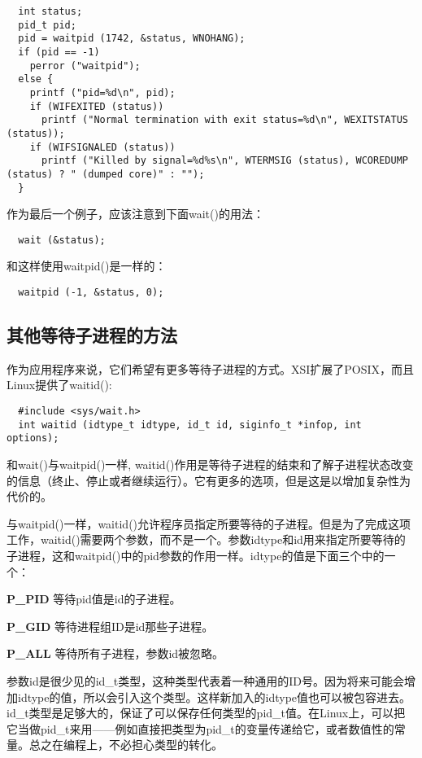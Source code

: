 \begin{lstlisting}
  int status;
  pid_t pid;
  pid = waitpid (1742, &status, WNOHANG);
  if (pid == -1)
    perror ("waitpid");
  else {
    printf ("pid=%d\n", pid);
    if (WIFEXITED (status))
      printf ("Normal termination with exit status=%d\n", WEXITSTATUS (status));
    if (WIFSIGNALED (status))
      printf ("Killed by signal=%d%s\n", WTERMSIG (status), WCOREDUMP (status) ? " (dumped core)" : "");
  }
\end{lstlisting}

作为最后一个例子，应该注意到下面wait()的用法：

\begin{lstlisting}
  wait (&status);
\end{lstlisting}

和这样使用waitpid()是一样的：

\begin{lstlisting}
  waitpid (-1, &status, 0);
\end{lstlisting}

\subsection{其他等待子进程的方法}

作为应用程序来说，它们希望有更多等待子进程的方式。XSI扩展了POSIX，而且Linux提供了waitid():

\begin{lstlisting}
  #include <sys/wait.h>
  int waitid (idtype_t idtype, id_t id, siginfo_t *infop, int options);
\end{lstlisting}

和wait()与waitpid()一样, waitid()作用是等待子进程的结束和了解子进程状态改变的信息（终止、停止或者继续运行）。它有更多的选项，但是这是以增加复杂性为代价的。

与waitpid()一样，waitid()允许程序员指定所要等待的子进程。但是为了完成这项工作，waitid()需要两个参数，而不是一个。参数idtype和id用来指定所要等待的子进程，这和waitpid()中的pid参数的作用一样。idtype的值是下面三个中的一个：

\begin{eqlist*}
\item[\textbf{P\_PID}] 等待pid值是id的子进程。
\item[\textbf{P\_GID}] 等待进程组ID是id那些子进程。
\item[\textbf{P\_ALL}] 等待所有子进程，参数id被忽略。
\end{eqlist*}

参数id是很少见的id\_t类型，这种类型代表着一种通用的ID号。因为将来可能会增加idtype的值，所以会引入这个类型。这样新加入的idtype值也可以被包容进去。id\_t类型是足够大的，保证了可以保存任何类型的pid\_t值。在Linux上，可以把它当做pid\_t来用——例如直接把类型为pid\_t的变量传递给它，或者数值性的常量。总之在编程上，不必担心类型的转化。

